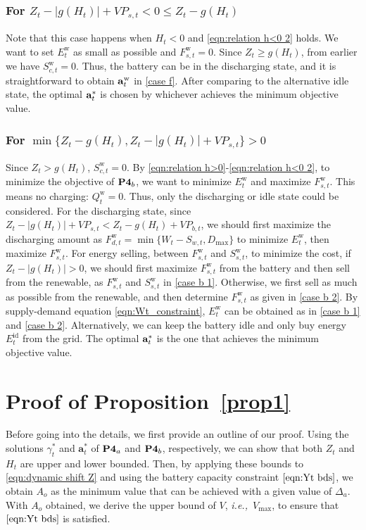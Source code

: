 \documentclass[journal]{IEEEtran}
\def\abf{{\bf a}}
\def\ie{{\it i.e.,\ \/}}
\def\w{\textrm{w}}
\begin{document}
\subsubsection{For $Z_t-|g(H_t)|+VP_{s,t}<0 \le Z_t-g(H_t)$} Note that this case  happens when $H_t<0$ and \eqref{eqn:relation h<0 2} holds.
We want to set  $E^\w_t$ as small as possible and $F^\w_{s,t}=0$. Since $Z_t\ge g(H_t)$, from earlier we have  $S^\w_{c,t}=0$. Thus, the battery  can be in the discharging state, and it is straightforward to obtain $\abf^\w_t$ in \eqref{case f}. After comparing to the alternative idle state, the optimal $\abf^*_t$ is chosen by whichever achieves the minimum objective value.
\subsubsection{For $\min\{Z_t-g(H_t),Z_t-|g(H_t)|+VP_{s,t}\}>0$} Since $Z_t> g(H_t)$,  $S^\w_{c,t}=0$. By \eqref{eqn:relation h>0}-\eqref{eqn:relation h<0 2}, to minimize the objective of $\text{\bf P4}_b$,  we want to minimize $E^\w_t$ and maximize $F^\w_{s,t}$. This means no charging:  $Q^\w_t=0$.
Thus, only the discharging  or idle state could be considered.
 For the discharging state, since $Z_t-|g(H_t)|+VP_{s,t}<Z_t-g(H_t)+VP_{b,t}$, we should first maximize the discharging amount as $F^\w_{d,t}=\min\{W_t-S_{w,t},D_{\max}\}$ to minimize $E^\w_t$, then maximize  $F^\w_{s,t}$. For energy selling, between $F^\w_{s,t}$ and $S^\w_{s,t}$, to minimize the cost, if $Z_t-|g(H_t)|>0$, we should first maximize $F^\w_{s,t}$ from the battery and then sell from the renewable, as $F^\w_{s,t}$ and $S^\w_{s,t}$ in \eqref{case b 1}. Otherwise, we first sell as much as possible from the renewable, and then determine    $F^\w_{s,t}$ as given in \eqref{case b 2}. By supply-demand  equation \eqref{eqn:Wt_constraint},  $E^\w_t$ can be obtained as in \eqref{case b 1} and \eqref{case b 2}.
Alternatively, we can keep the battery idle and only buy energy $E_t^\textrm{id}$ from the grid. The optimal $\abf^*_t$ is the one that achieves the minimum objective value.

\section{Proof of Proposition~\ref{prop1}}\label{appC}
\IEEEproof
Before going into the details, we first provide an outline of our proof. Using the solutions $\gamma^*_t$ and $\mathbf{a}^*_t$ of  $\text{\bf P4}_a$ and  $\text{\bf P4}_b$, respectively, we can show that both $Z_t$ and $H_t$ are upper and lower bounded. Then, by applying these bounds to \eqref{eqn:dynamic shift Z} and using the battery capacity constraint $\eqref{eqn:Yt bds}$, we obtain $A_o$ as the minimum value that can be achieved with a given value of $\Delta_a$. With $A_o$ obtained, we derive the upper bound of $V$, \ie $V_{\max}$, to ensure that $\eqref{eqn:Yt bds}$ is satisfied.
\end{document}
